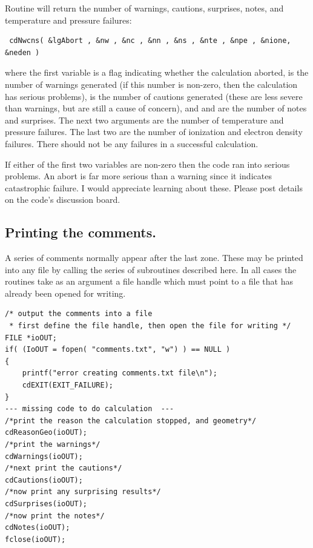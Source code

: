 Routine  will return the number of warnings, cautions, surprises,
notes, and temperature and pressure failures:
\begin{verbatim}
 cdNwcns( &lgAbort , &nw , &nc , &nn , &ns , &nte , &npe , &nione, &neden )
\end{verbatim}
where the first variable is a  flag indicating whether the calculation
aborted,  is the number of warnings generated (if this number is non-zero,
then the calculation has serious problems),  is the number of cautions
generated (these are less severe than warnings, but are still a cause of
concern), and  and  are the number of notes and surprises.
The next
two arguments are the number of temperature and pressure failures.
The
last two are the number of ionization and electron density failures.  There
should not be any failures in a successful calculation.

If either of the first two variables are non-zero then the code ran into
serious problems.  An abort is far more serious than a warning since it
indicates catastrophic failure.  I would appreciate learning about these.
Please post details on the code's discussion board.

\subsection{Printing the comments.}

A series of comments normally appear after the last zone.  These may
be printed into any file by calling the series of subroutines described
here.  In all cases the routines take as an argument a file handle which
must point to a file that has already been opened for writing.
\begin{verbatim}
/* output the comments into a file
 * first define the file handle, then open the file for writing */
FILE *ioOUT;
if( (IoOUT = fopen( "comments.txt", "w") ) == NULL )
{
    printf("error creating comments.txt file\n");
    cdEXIT(EXIT_FAILURE);
}
--- missing code to do calculation  ---
/*print the reason the calculation stopped, and geometry*/
cdReasonGeo(ioOUT);
/*print the warnings*/
cdWarnings(ioOUT);
/*next print the cautions*/
cdCautions(ioOUT);
/*now print any surprising results*/
cdSurprises(ioOUT);
/*now print the notes*/
cdNotes(ioOUT);
fclose(ioOUT);
\end{verbatim}

